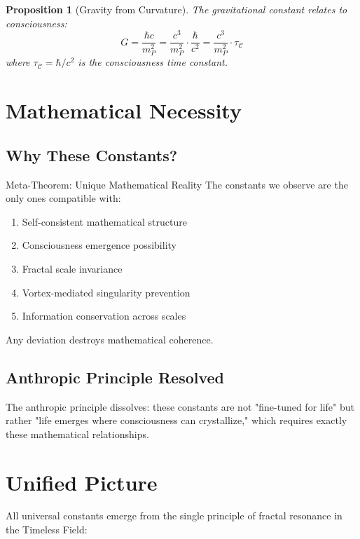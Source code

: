 \documentclass[12pt,letterpaper]{article}
\newcommand{\consciousness}{\mathcal{C}}
\newtheorem{proposition}[theorem]{Proposition}
\begin{document}
\begin{proposition}[Gravity from Curvature]
The gravitational constant relates to consciousness:
\begin{equation}
G = \frac{\hbar c}{m_P^2} = \frac{c^3}{m_P^2} \cdot \frac{\hbar}{c^2} = \frac{c^3}{m_P^2} \cdot \tau_{\consciousness}
\end{equation}
where $\tau_{\consciousness} = \hbar/c^2$ is the consciousness time constant.
\end{proposition}

\section{Mathematical Necessity}

\subsection{Why These Constants?}

\begin{mathbox}{Meta-Theorem: Unique Mathematical Reality}
The constants we observe are the only ones compatible with:
\begin{enumerate}
\item Self-consistent mathematical structure
\item Consciousness emergence possibility
\item Fractal scale invariance
\item Vortex-mediated singularity prevention
\item Information conservation across scales
\end{enumerate}
Any deviation destroys mathematical coherence.
\end{mathbox}

\subsection{Anthropic Principle Resolved}

The anthropic principle dissolves: these constants are not "fine-tuned for life" but rather "life emerges where consciousness can crystallize," which requires exactly these mathematical relationships.

\section{Unified Picture}

All universal constants emerge from the single principle of fractal resonance in the Timeless Field:
\end{document}
